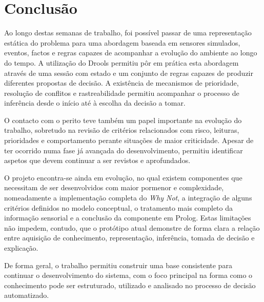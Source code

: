 \chapter{Conclusão}
\label{cap:conclusao}

Ao longo destas semanas de trabalho, foi possível passar de uma representação
estática do problema para uma abordagem baseada em sensores simulados,
eventos, factos e regras capazes de acompanhar a evolução do ambiente ao longo
do tempo. A utilização do Drools permitiu pôr em prática esta abordagem através
de uma sessão com estado e um conjunto de regras capazes de produzir
diferentes propostas de decisão. A existência de mecanismos de prioridade,
resolução de conflitos e rastreabilidade permitiu acompanhar o processo de
inferência desde o início até à escolha da decisão a tomar.

O contacto com o perito teve também um papel importante na evolução do
trabalho, sobretudo na revisão de critérios relacionados com risco, leituras,
prioridades e comportamento perante situações de maior criticidade. Apesar de
ter ocorrido numa fase já avançada do desenvolvimento, permitiu identificar
aspetos que devem continuar a ser revistos e aprofundados.

O projeto encontra-se ainda em evolução, no qual existem componentes que
necessitam de ser desenvolvidos com maior pormenor e complexidade,
nomeadamente a implementação completa do \emph{Why Not}, a integração de
alguns critérios definidos no modelo conceptual, o tratamento mais completo da
informação sensorial e a conclusão da componente em Prolog. Estas limitações
não impedem, contudo, que o protótipo atual demonstre de forma clara a relação
entre aquisição de conhecimento, representação, inferência, tomada de decisão
e explicação.

De forma geral, o trabalho permitiu construir uma base consistente para
continuar o desenvolvimento do sistema, com o foco principal na forma como o
conhecimento pode ser estruturado, utilizado e analisado no processo de
decisão automatizado.
